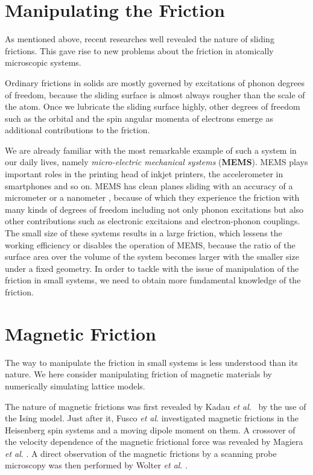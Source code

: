 \section{Manipulating the Friction}

As mentioned above, recent researches well revealed the nature of sliding frictions. This gave rise to new problems about the friction in atomically microscopic systems.

Ordinary frictions in solids are mostly governed by excitations of phonon degrees of freedom, because the sliding surface is almost always rougher than the scale of the atom. Once we lubricate the sliding surface highly, other degrees of freedom such as the orbital and the spin angular momenta of electrons emerge as additional contributions to the friction.

We are already familiar with the most remarkable example of such a system in our daily lives, namely \textit{micro-electric mechanical systems} (\textbf{MEMS}). MEMS plays important roles in the printing head of inkjet printers, the accelerometer in smartphones and so on. MEMS has clean planes sliding with an accuracy of a micrometer or a nanometer \cite{Kim2007,Grierson2007,Manini2017}, because of which they experience the friction with many kinds of degrees of freedom including not only phonon excitations but also other contributions such as electronic excitaions and electron-phonon couplings. The small size of these systems results in a large friction, which lessens the working efficiency or disables the operation of MEMS, because the ratio of the surface area over the volume of the system becomes larger with the smaller size under a fixed geometry. In order to tackle with the issue of manipulation of the friction in small systems, we need to obtain more fundamental knowledge of the friction.

\section{Magnetic Friction}
The way to manipulate the friction in small systems is less understood than its nature. We here consider manipulating friction of magnetic materials by numerically simulating lattice models. 

The nature of magnetic frictions was first revealed by Kadau \textit{et al}. \cite{Kadau2008}\ by the use of the Ising model. Just after it, Fusco \textit{et al}. \cite{Fusco2008} investigated magnetic frictions in the Heisenberg spin systems and a moving dipole moment on them. A crossover of the velocity dependence of the magnetic frictional force was revealed by Magiera \textit{et al}. \cite{Magiera2011}. A direct observation of the magnetic frictions by a scanning probe microscopy was then performed by Wolter \textit{et al}. \cite{Wolter2012}.

